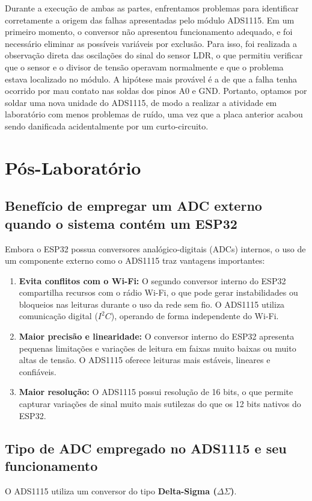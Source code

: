 \documentclass[a4paper,oneside,10pt]{article}
\begin{document}
Durante a execução de ambas as partes, enfrentamos problemas para identificar corretamente a origem das falhas apresentadas pelo módulo ADS1115. Em um primeiro momento, o conversor não apresentou funcionamento adequado, e foi necessário eliminar as possíveis variáveis por exclusão. Para isso, foi realizada a observação direta das oscilações do sinal do sensor LDR, o que permitiu verificar que o sensor e o divisor de tensão operavam normalmente e que o problema estava localizado no módulo. A hipótese mais provável é a de que a falha tenha ocorrido por mau contato nas soldas dos pinos A0 e GND. Portanto, optamos por soldar uma nova unidade do ADS1115, de modo a realizar a atividade em laboratório com menos problemas de ruído, uma vez que a placa anterior acabou sendo danificada acidentalmente por um curto-circuito.

\section{Pós-Laboratório}

\subsection{Benefício de empregar um ADC externo quando o sistema contém um ESP32}
Embora o ESP32 possua conversores analógico-digitais (ADCs) internos, o uso de um componente externo como o ADS1115 traz vantagens importantes:
\begin{enumerate}
	\item \textbf{Evita conflitos com o Wi-Fi:} O segundo conversor interno do ESP32 compartilha recursos com o rádio Wi-Fi, o que pode gerar instabilidades ou bloqueios nas leituras durante o uso da rede sem fio. O ADS1115 utiliza comunicação digital ($I^2C$), operando de forma independente do Wi-Fi.
	\item \textbf{Maior precisão e linearidade:} O conversor interno do ESP32 apresenta pequenas limitações e variações de leitura em faixas muito baixas ou muito altas de tensão. O ADS1115 oferece leituras mais estáveis, lineares e confiáveis.
	\item \textbf{Maior resolução:} O ADS1115 possui resolução de 16 bits, o que permite capturar variações de sinal muito mais sutilezas do que os 12 bits nativos do ESP32.
\end{enumerate}

\subsection{Tipo de ADC empregado no ADS1115 e seu funcionamento}
O ADS1115 utiliza um conversor do tipo \textbf{Delta-Sigma ($\Delta\Sigma$)}. 
\end{document}
